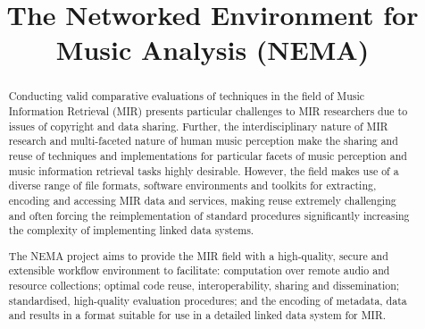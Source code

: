 \documentclass[conference]{IEEEtran}
\begin{document}
%
\title{The Networked Environment for Music Analysis (NEMA)}



\author{
}


\maketitle

\begin{abstract}
Conducting valid comparative evaluations of techniques in the field of Music Information Retrieval (MIR) presents particular challenges to MIR researchers due to issues of copyright and data sharing. Further, the interdisciplinary nature of MIR research and multi-faceted nature of human music perception make the sharing and reuse of techniques and implementations for particular facets of music perception and music information retrieval tasks highly desirable. However, the field makes use of a diverse range of file formats, software environments and toolkits for extracting, encoding and accessing MIR data and services, making reuse extremely challenging and often forcing the reimplementation of standard procedures significantly increasing the complexity of implementing linked data systems. 

The NEMA project aims to provide the MIR field with a high-quality, secure and extensible workflow environment to facilitate: computation over remote audio and resource collections; optimal code reuse, interoperability, sharing and dissemination; standardised, high-quality evaluation procedures; and the encoding of metadata, data and results in a format suitable for use in a detailed linked data system for MIR. 

\end{abstract}
\end{document}
